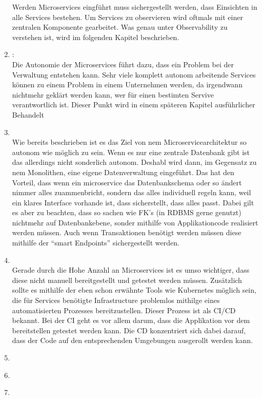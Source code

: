 \begin{definition}
\begin{enumerate}
		Werden Microservices eingführt muss sichergestellt werden, dass Einsichten in alle Services bestehen. Um Services zu observieren wird oftmals mit einer zentralen Komponente gearbeitet. Was genau unter Observability zu verstehen ist, wird im folgenden Kapitel beschrieben.
		\item {}:\\
		Die Autonomie der Microservices führt dazu, dass ein Problem bei der Verwaltung entstehen kann. Sehr viele komplett autonom arbeitende Services können zu einem Problem in einem Unternehmen werden, da irgendwann nichtmehr geklärt werden kann, wer für einen bestimten Servive verantwortlich ist. Dieser Punkt wird in einem späteren Kapitel ausführlicher Behandelt
		\item {}\\
		Wie bereits beschrieben ist es das Ziel von nem Microservicearchitektur so autonom wie möglich zu sein. Wenn es nur eine zentrale Datenbank gibt ist das allerdings nicht sonderlich autonom. Deshabl wird dann, im Gegensatz zu nem Monolithen, eine eigene Datenverwaltung eingeführt. Das hat den Vorteil, dass wenn ein microservice das Datenbankschema oder so ändert nimmer alles zuammenbricht, sondern das alles individuell regeln kann, weil ein klares Interface vorhande ist, dass sicherstellt, dass alles passt. Dabei gilt es aber zu beachten, dass so sachen wie FK's (in \ac{RDBMS} gerne genutzt) nichtmehr auf Datenbankebene, sonder mithilfe von Applikationcode realisiert werden müssen. Auch wenn Transaktionen benötigt werden müssen diese mithilfe der \enquote{smart Endpoints} sichergestellt werden.
		\item {}\\
		Gerade durch die Hohe Anzahl an Microservices ist es umso wichtiger, dass diese nicht manuell bereitgestellt und getestet werden müssen. Zusätzlich sollte es mithilfe der eben schon erwähnte Tools wie Kubernetes möglich sein, die für Services benötigte Infrastructure problemlos mithilge eines automatisierten Prozesses bereitzustellen. Dieser Prozess ist als \ac{CI}/\ac{CD} bekannt. Bei der \ac{CI} geht es vor allem darum, dass die Applikation vor dem bereitstellen getestet werden kann. Die \ac{CD} konzentriert sich dabei darauf, dass der Code auf den entsprechenden Umgebungen ausgerollt werden kann.
		\item {}\\
		\item {}\\
		\item {}\\
	\end{enumerate}
\end{definition}



